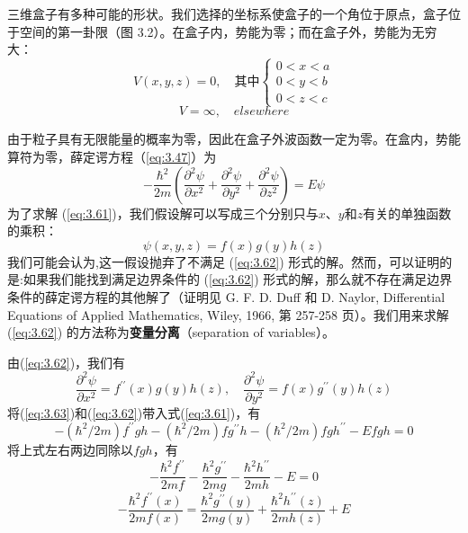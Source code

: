 	三维盒子有多种可能的形状。我们选择的坐标系使盒子的一个角位于原点，盒子位于空间的第一卦限（图 3.2）。在盒子内，势能为零；而在盒子外，势能为无穷大：
	\begin{equation}
		V\left(x,y,z\right) = 0, \quad \text{其中}
		\begin{cases}
			0 < x < a\\
			0 < y < b\\
			0 < z < c
		\end{cases}
		\label{eq:3.60}
	\end{equation}
	\begin{equation*}
		V = \infty, \quad elsewhere
	\end{equation*}

	由于粒子具有无限能量的概率为零，因此在盒子外波函数一定为零。在盒内，势能算符为零，薛定谔方程（\ref{eq:3.47}）为
	\begin{equation}
		-\frac{\hbar^2}{2m}\left(\frac{\partial^2\psi}{\partial x^2} + \frac{\partial^2\psi}{\partial y^2} + \frac{\partial^2\psi}{\partial z^2}\right) = E\psi
		\label{eq:3.61}
	\end{equation}
	为了求解 (\ref{eq:3.61})，我们假设解可以写成三个分别只与$x$、$y$和$z$有关的单独函数的乘积：
	\begin{equation}
		\psi\left(x,y,z\right) = f\left(x\right)g\left(y\right)h\left(z\right)
		\label{eq:3.62}
	\end{equation}
	我们可能会认为,这一假设抛弃了不满足 (\ref{eq:3.62}) 形式的解。然而，可以证明的是:如果我们能找到满足边界条件的 (\ref{eq:3.62}) 形式的解，那么就不存在满足边界条件的薛定谔方程的其他解了（证明见 G. F. D. Duff 和 D. Naylor, Differential Equations of Applied Mathematics, Wiley, 1966, 第 257-258 页）。我们用来求解 (\ref{eq:3.62}) 的方法称为\textbf{变量分离}（separation of variables）。

	由(\ref{eq:3.62})，我们有
	\begin{equation}
		\frac{\partial^2\psi}{\partial x^2} = f^{\prime\prime}\left(x\right)g\left(y\right)h\left(z\right), \quad \frac{\partial^2\psi}{\partial y^2} = f\left(x\right)g^{\prime\prime}\left(y\right)h\left(z\right)
		\label{eq:3.63}
	\end{equation}
	将(\ref{eq:3.63})和(\ref{eq:3.62})带入式(\ref{eq:3.61})，有
	\begin{equation}
		-\left(\hbar^2/2m\right)f^{\prime\prime}gh-\left(\hbar^2/2m\right)fg^{\prime\prime}h-\left(\hbar^2/2m\right)fgh^{\prime\prime}-Efgh = 0
		\label{eq:3.64}
	\end{equation}
	将上式左右两边同除以$fgh$，有
	\begin{equation}
		- \frac{\hbar^2f^{\prime\prime}}{2mf}- \frac{\hbar^2g^{\prime\prime}}{2mg}- \frac{\hbar^2h^{\prime\prime}}{2mh} -E = 0
		\label{eq:3.65}
	\end{equation}
	\begin{equation}
		-\frac{\hbar^2f^{\prime\prime}\left(x\right)}{2mf\left(x\right)} = \frac{\hbar^2g^{\prime\prime}\left(y\right)}{2mg\left(y\right)}+\frac{\hbar^2h^{\prime\prime}\left(z\right)}{2mh\left(z\right)}+E
		\label{eq:3.66}
	\end{equation}


